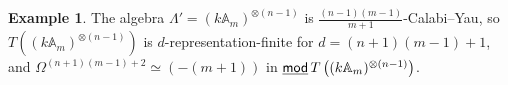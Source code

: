 \documentclass[a4paper,reqno,11pt]{amsart}
\newtheorem{proposition}[theorem]{Proposition}
\theoremstyle{definition}
\newtheorem{example}[theorem]{Example}
\newcommand{\TT}{\mathcal{T}}
\newcommand{\Hom}{\operatorname{Hom}\nolimits}
\newcommand{\x}{\vec x}
\DeclareMathOperator{\proj}{\mathsf{proj}}
\newcommand{\stmod}{\mathop{\underline{\mod}}\nolimits}
\numberwithin{equation}{section}
\begin{document}
\begin{example}
  The algebra $\Lambda'= (k\mathbb{A}_m)^{\otimes(n-1)}$ is $\frac{(n-1)(m-1)}{m+1}$-Calabi--Yau, so $T\left((k\mathbb{A}_m)^{\otimes(n-1)}\right)$ is $d$-representation-finite for $d=(n+1)(m-1) +1$, and $\Omega^{(n+1)(m-1)+2}\simeq (-(m+1))$ in $\stmod T\left((k\mathbb{A}_m)^{\otimes(n-1)}\right)$. 
\end{example}









\end{document}
